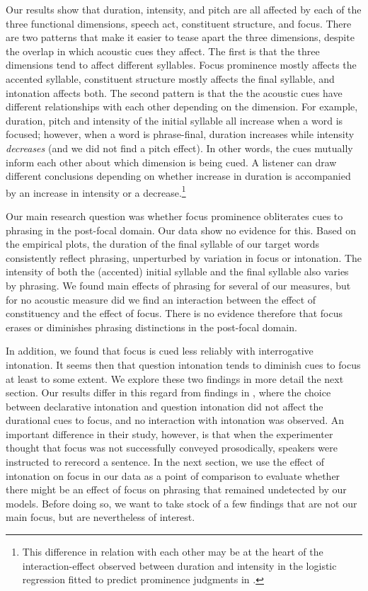 \documentclass[preprint,review,12pt,authoryear,times]{elsarticle}
\begin{document}
Our results show that duration, intensity, and pitch are all affected by each of the three functional dimensions, speech act, constituent structure, and focus. There are two patterns that make it easier to tease apart the three dimensions, despite the overlap in which acoustic cues they affect. The first is that the three dimensions tend to affect different syllables. Focus prominence mostly affects the accented syllable, constituent structure mostly affects the final syllable, and intonation affects both.  The second pattern is that the the acoustic cues have different relationships with each other depending on the dimension. For example, duration, pitch and intensity of the initial syllable all increase when a word is focused; however, when a word  is phrase-final, duration increases while intensity {\em decreases} (and we did not find a pitch effect). In other words, the cues mutually inform each other about which dimension is being cued. A listener can draw different conclusions depending on whether increase in duration is accompanied by an increase in intensity or a decrease.\footnote{This difference in relation with each other may be at the heart of the interaction-effect observed between duration and intensity in the logistic regression fitted to predict prominence judgments in \citet{bisho19}.}

Our main research question was whether focus prominence obliterates cues to phrasing in the post-focal domain. Our data show no evidence for this. Based on the empirical plots, the duration of the final syllable of our target words consistently reflect phrasing, unperturbed by variation in focus or intonation. The intensity of both the (accented) initial syllable and the final syllable also varies by phrasing. We found main effects of phrasing for several of our measures, but for no acoustic measure did we find an interaction between the effect of constituency and the effect of focus. There is no evidence therefore that focus erases or diminishes phrasing distinctions in the post-focal domain. 

In addition, we found that focus is cued less reliably with interrogative intonation. It seems then that question intonation tends to diminish cues to focus at least to some extent.  We explore these two findings in more detail the next section. Our results differ in this regard from findings in \citet{eady86}, where the choice between declarative intonation and question intonation did not affect the durational cues to focus, and no interaction with intonation was observed. An important difference in their study, however, is that when the experimenter thought that focus was not successfully conveyed prosodically, speakers were instructed to rerecord a sentence. In the next section, we use the effect of intonation on focus in our data as a point of comparison to evaluate whether there might be an effect of focus on phrasing that remained undetected by our models. Before doing so,  we want to take stock of a few findings that are not our main focus, but are nevertheless of interest. 
\end{document}
